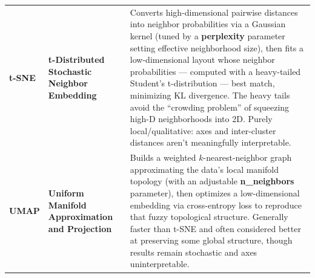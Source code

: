 \documentclass[11pt]{article}
\newcommand{\glossaryhighlight}[1]{\textbf{\boldmath#1}}
\begin{document}
\begin{longtable}{P{2cm} P{3cm} P{11cm}}
\glossaryhighlight{t-SNE} & \glossaryhighlight{t-Distributed Stochastic Neighbor Embedding} &
Converts high-dimensional pairwise distances into neighbor probabilities via a Gaussian kernel (tuned by a \textbf{perplexity} parameter setting effective neighborhood size), then fits a low-dimensional layout whose neighbor probabilities --- computed with a heavy-tailed Student's t-distribution --- best match, minimizing KL divergence. The heavy tails avoid the ``crowding problem'' of squeezing high-D neighborhoods into 2D. Purely local/qualitative: axes and inter-cluster distances aren't meaningfully interpretable. \\

\glossaryhighlight{UMAP} & \glossaryhighlight{Uniform Manifold Approximation and Projection} &
Builds a weighted $k$-nearest-neighbor graph approximating the data's local manifold topology (with an adjustable \textbf{n\_neighbors} parameter), then optimizes a low-dimensional embedding via cross-entropy loss to reproduce that fuzzy topological structure. Generally faster than t-SNE and often considered better at preserving some global structure, though results remain stochastic and axes uninterpretable. \\

\bottomrule
\end{longtable}
\end{document}
